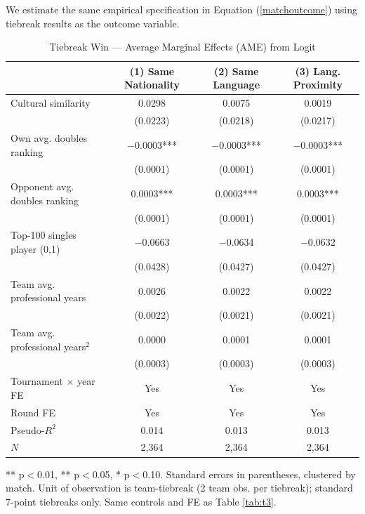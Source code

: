 \documentclass[10pt]{article}
\begin{document}
We estimate the same empirical specification in Equation (\ref{matchoutcome}) using tiebreak results as the outcome variable.


\begin{table}[htbp]
\color{blue}
\centering
\caption{Tiebreak Win — Average Marginal Effects (AME) from Logit \label{tab:t4}}
\begin{threeparttable}
\begin{tabular}{lccc}
\toprule
 & (1) Same Nationality & (2) Same Language & (3) Lang. Proximity \\
\midrule
Cultural similarity & 0.0298 & 0.0075 & 0.0019 \\
 & (0.0223) & (0.0218) & (0.0217) \\
Own avg. doubles ranking & $-$0.0003*** & $-$0.0003*** & $-$0.0003*** \\
 & (0.0001) & (0.0001) & (0.0001) \\
Opponent avg. doubles ranking & 0.0003*** & 0.0003*** & 0.0003*** \\
 & (0.0001) & (0.0001) & (0.0001) \\
Top-100 singles player (0,1) & $-$0.0663 & $-$0.0634 & $-$0.0632 \\
 & (0.0428) & (0.0427) & (0.0427) \\
Team avg. professional years & 0.0026 & 0.0022 & 0.0022 \\
 & (0.0022) & (0.0021) & (0.0021) \\
Team avg. professional years$^2$ & 0.0000 & 0.0001 & 0.0001 \\
 & (0.0003) & (0.0003) & (0.0003) \\
\midrule
Tournament $\times$ year FE & Yes & Yes & Yes \\
Round FE & Yes & Yes & Yes \\
Pseudo-$R^2$ & 0.014 & 0.013 & 0.013 \\
$N$ & 2,364 & 2,364 & 2,364 \\
\bottomrule
\end{tabular}
\begin{tablenotes}
\small
\item *** p$<$0.01, ** p$<$0.05, * p$<$0.10. Standard errors in parentheses, clustered by match. Unit of observation is team-tiebreak (2 team obs. per tiebreak); standard 7-point tiebreaks only. Same controls and FE as Table \ref{tab:t3}.
\end{tablenotes}
\end{threeparttable}
\end{table}
\FloatBarrier
\end{document}
